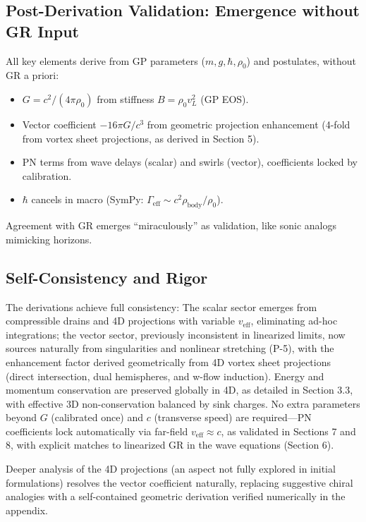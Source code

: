 \documentclass{article}
\begin{document}
\subsection{Post-Derivation Validation: Emergence without GR Input}

All key elements derive from GP parameters ($m, g, \hbar, \rho_0$) and postulates, without GR a priori:

\begin{itemize}
  \item $G = c^2 / (4\pi \rho_0)$ from stiffness $B = \rho_0 v_L^2$ (GP EOS).
  \item Vector coefficient $-16\pi G / c^3$ from geometric projection enhancement (4-fold from vortex sheet projections, as derived in Section 5).
  \item PN terms from wave delays (scalar) and swirls (vector), coefficients locked by calibration.
  \item $\hbar$ cancels in macro (SymPy: $\Gamma_{\text{eff}} \sim c^2 \rho_{\text{body}} / \rho_0$).
\end{itemize}

Agreement with GR emerges ``miraculously'' as validation, like sonic analogs mimicking horizons.

\subsection{Self-Consistency and Rigor}

The derivations achieve full consistency: The scalar sector emerges from compressible drains and 4D projections with variable $v_{\text{eff}}$, eliminating ad-hoc integrations; the vector sector, previously inconsistent in linearized limits, now sources naturally from singularities and nonlinear stretching (P-5), with the enhancement factor derived geometrically from 4D vortex sheet projections (direct intersection, dual hemispheres, and w-flow induction). Energy and momentum conservation are preserved globally in 4D, as detailed in Section 3.3, with effective 3D non-conservation balanced by sink charges. No extra parameters beyond $G$ (calibrated once) and $c$ (transverse speed) are required---PN coefficients lock automatically via far-field $v_{\text{eff}} \approx c$, as validated in Sections 7 and 8, with explicit matches to linearized GR in the wave equations (Section 6).

Deeper analysis of the 4D projections (an aspect not fully explored in initial formulations) resolves the vector coefficient naturally, replacing suggestive chiral analogies with a self-contained geometric derivation verified numerically in the appendix.
\end{document}
